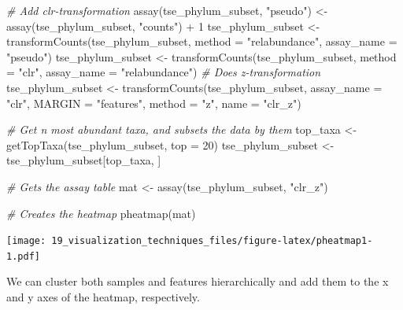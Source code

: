 \documentclass[
]{book}
\newenvironment{Shaded}{\begin{snugshade}}{\end{snugshade}}
\newcommand{\AttributeTok}[1]{\textcolor[rgb]{0.77,0.63,0.00}{#1}}
\newcommand{\CommentTok}[1]{\textcolor[rgb]{0.56,0.35,0.01}{\textit{#1}}}
\newcommand{\DecValTok}[1]{\textcolor[rgb]{0.00,0.00,0.81}{#1}}
\newcommand{\FunctionTok}[1]{\textcolor[rgb]{0.00,0.00,0.00}{#1}}
\newcommand{\NormalTok}[1]{#1}
\newcommand{\OtherTok}[1]{\textcolor[rgb]{0.56,0.35,0.01}{#1}}
\newcommand{\SpecialCharTok}[1]{\textcolor[rgb]{0.00,0.00,0.00}{#1}}
\newcommand{\StringTok}[1]{\textcolor[rgb]{0.31,0.60,0.02}{#1}}
\begin{document}
\begin{Shaded}
\begin{Highlighting}[]
\CommentTok{\# Add clr{-}transformation}
\FunctionTok{assay}\NormalTok{(tse\_phylum\_subset, }\StringTok{"pseudo"}\NormalTok{) }\OtherTok{\textless{}{-}} \FunctionTok{assay}\NormalTok{(tse\_phylum\_subset, }\StringTok{"counts"}\NormalTok{) }\SpecialCharTok{+} \DecValTok{1}
\NormalTok{tse\_phylum\_subset }\OtherTok{\textless{}{-}} \FunctionTok{transformCounts}\NormalTok{(tse\_phylum\_subset, }\AttributeTok{method =} \StringTok{"relabundance"}\NormalTok{,}
                                     \AttributeTok{assay\_name =} \StringTok{"pseudo"}\NormalTok{)}
\NormalTok{tse\_phylum\_subset }\OtherTok{\textless{}{-}} \FunctionTok{transformCounts}\NormalTok{(tse\_phylum\_subset, }\AttributeTok{method =} \StringTok{"clr"}\NormalTok{,}
                                     \AttributeTok{assay\_name =} \StringTok{"relabundance"}\NormalTok{)}
\CommentTok{\# Does z{-}transformation}
\NormalTok{tse\_phylum\_subset }\OtherTok{\textless{}{-}} \FunctionTok{transformCounts}\NormalTok{(tse\_phylum\_subset, }\AttributeTok{assay\_name =} \StringTok{"clr"}\NormalTok{,}
                                     \AttributeTok{MARGIN =} \StringTok{"features"}\NormalTok{, }
                                     \AttributeTok{method =} \StringTok{"z"}\NormalTok{, }\AttributeTok{name =} \StringTok{"clr\_z"}\NormalTok{)}

\CommentTok{\# Get n most abundant taxa, and subsets the data by them}
\NormalTok{top\_taxa }\OtherTok{\textless{}{-}} \FunctionTok{getTopTaxa}\NormalTok{(tse\_phylum\_subset, }\AttributeTok{top =} \DecValTok{20}\NormalTok{)}
\NormalTok{tse\_phylum\_subset }\OtherTok{\textless{}{-}}\NormalTok{ tse\_phylum\_subset[top\_taxa, ]}

\CommentTok{\# Gets the assay table}
\NormalTok{mat }\OtherTok{\textless{}{-}} \FunctionTok{assay}\NormalTok{(tse\_phylum\_subset, }\StringTok{"clr\_z"}\NormalTok{)}

\CommentTok{\# Creates the heatmap}
\FunctionTok{pheatmap}\NormalTok{(mat)}
\end{Highlighting}
\end{Shaded}

\texttt{[image: 19\_visualization\_techniques\_files/figure-latex/pheatmap1-1.pdf]}

We can cluster both samples and features hierarchically and add them to the
x and y axes of the heatmap, respectively.
\end{document}
